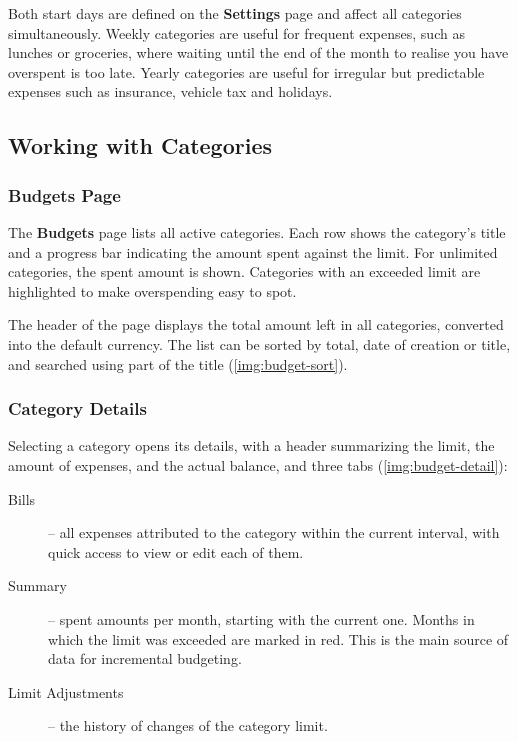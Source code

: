 \noindent Both start days are defined on the \textbf{Settings} page and affect all categories
simultaneously. Weekly categories are useful for frequent expenses, such as lunches or
groceries, where waiting until the end of the month to realise you have overspent is too
late. Yearly categories are useful for irregular but predictable expenses such as insurance,
vehicle tax and holidays.


\subsection{Working with Categories}

\subsubsection{Budgets Page}

The \textbf{Budgets} page lists all active categories. Each row shows the category's title
and a progress bar indicating the amount spent against the limit. For unlimited categories,
the spent amount is shown. Categories with an exceeded limit are highlighted to make
overspending easy to spot.

The header of the page displays the total amount left in all categories, converted into the
default currency. The list can be sorted by total, date of creation or title, and searched
using part of the title (\cref{img:budget-sort}).



\subsubsection{Category Details}

Selecting a category opens its details, with a header summarizing the limit, the amount of
expenses, and the actual balance, and three tabs (\cref{img:budget-detail}):


\begin{description}
  \item[Bills] -- all expenses attributed to the category within the current interval, with
  quick access to view or edit each of them.
  \item[Summary] -- spent amounts per month, starting with the current one. Months in which
  the limit was exceeded are marked in red. This is the main source of data for incremental
  budgeting.
  \item[Limit Adjustments] -- the history of changes of the category limit.
\end{description}

